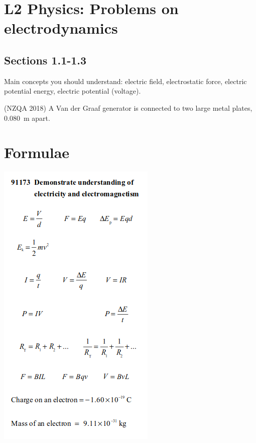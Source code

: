 \documentclass[a4paper]{exam}
\begin{document}
  \section*{L2 Physics: Problems on electrodynamics}
  \subsection*{Sections 1.1-1.3}
  Main concepts you should understand: electric field, electrostatic force, electric potential energy, electric potential (voltage).
  \begin{questions}
    \question (NZQA 2018) A Van der Graaf generator is connected to two large metal plates, \SI{0.080}{\metre} apart.
  \end{questions}
  \clearpage
  \section*{Formulae}
  \includegraphics{edyn}
\end{document}
